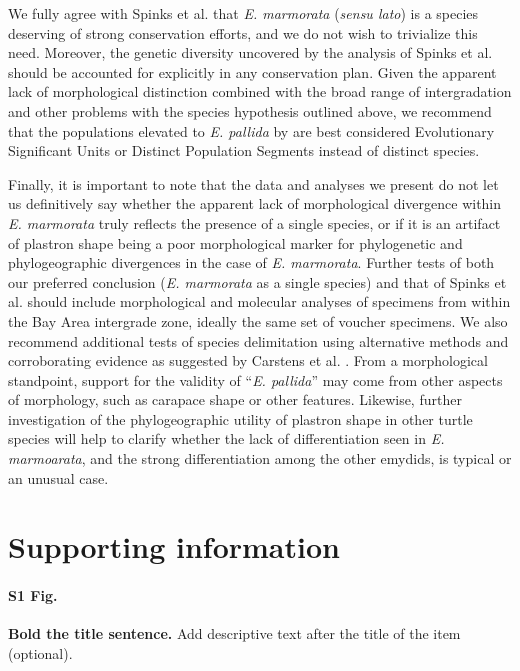 \documentclass[10pt,letterpaper]{article}
\begin{document}
We fully agree with Spinks et al. \cite{Spinks2014} that \textit{E. marmorata} (\textit{sensu lato}) is a species deserving of strong conservation efforts, and we do not wish to trivialize this need. Moreover, the genetic diversity uncovered by the analysis of Spinks et al. \cite{Spinks2014} should be accounted for explicitly in any conservation plan. Given the apparent lack of morphological distinction combined with the broad range of intergradation and other problems with the species hypothesis outlined above, we recommend that the populations elevated to \textit{E. pallida} by \cite{Spinks2014} are best considered Evolutionary Significant Units or Distinct Population Segments instead of distinct species.

Finally, it is important to note that the data and analyses we present do not let us definitively say whether the apparent lack of morphological divergence within \textit{E. marmorata} truly reflects the presence of a single species, or if it is an artifact of plastron shape being a poor morphological marker for phylogenetic and phylogeographic divergences in the case of \textit{E. marmorata}. Further tests of both our preferred conclusion (\textit{E. marmorata} as a single species) and that of Spinks et al. \cite{Spinks2014} should include morphological and molecular analyses of specimens from within the Bay Area intergrade zone, ideally the same set of voucher specimens. We also recommend additional tests of species delimitation using alternative methods and corroborating evidence as suggested by Carstens et al. \cite{Carstens2013}. From a morphological standpoint, support for the validity of ``\textit{E. pallida}'' may come from other aspects of morphology, such as carapace shape or other features. Likewise, further investigation of the phylogeographic utility of plastron shape in other turtle species will help to clarify whether the lack of differentiation seen in \textit{E. marmoarata}, and the strong differentiation among the other emydids, is typical or an unusual case.


\section*{Supporting information}

\paragraph*{S1 Fig.}
\label{S1_Fig}
{\bf Bold the title sentence.} Add descriptive text after the title of the item (optional).
\end{document}
